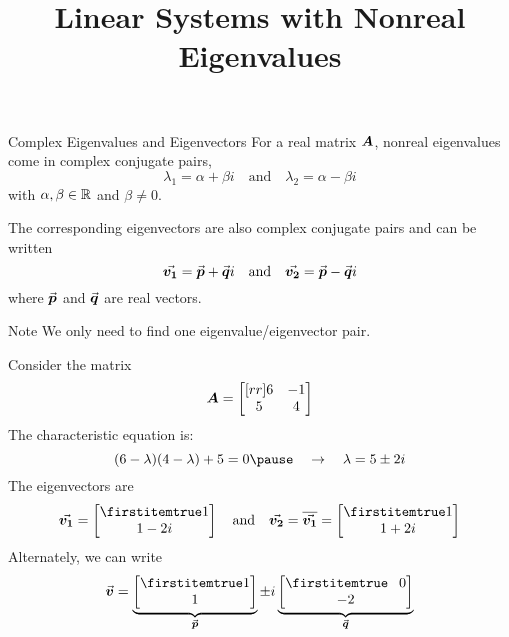 \documentclass{beamer}
\title[MA245 - Section 6.3]{Linear Systems with Nonreal Eigenvalues}
\begin{document}
\begin{frame}
  \titlepage
\end{frame}

\begin{frame}
\begin{block}{Complex Eigenvalues and Eigenvectors}
For a real matrix $\boldsymbol{A}$, nonreal eigenvalues come in complex conjugate pairs,
\begin{equation*}
\lambda_1=\alpha+\beta i
\quad\text{and}\quad
\lambda_2=\alpha-\beta i
\end{equation*}
with $\alpha,\beta\in\mathbb{R}$ and $\beta\neq0$.

\vspace{2mm}
The corresponding eigenvectors are also complex conjugate pairs and can be written
\begin{equation*}
{\vec{\boldsymbol{v_1}}}={\vec{\boldsymbol{p}}}+{\vec{\boldsymbol{q}}}i
\quad\text{and}\quad
{\vec{\boldsymbol{v_2}}}={\vec{\boldsymbol{p}}}-{\vec{\boldsymbol{q}}}i
\end{equation*}
where ${\vec{\boldsymbol{p}}}$ and ${\vec{\boldsymbol{q}}}$ are real vectors.
\end{block}\pause
\begin{block}{Note}
We only need to find one eigenvalue/eigenvector pair.
\end{block}
\end{frame}

\begin{frame}
\begin{example}
Consider the matrix
\begin{equation*}
\boldsymbol{A}=
\begin{bmatrix}[rr]
6 & -1 \\
5 &  4 \\
\end{bmatrix}
\end{equation*}\pause
The characteristic equation is:
\begin{equation*}
(6-\lambda)(4-\lambda)+5=0\pause
\quad\rightarrow\quad
\lambda=5\pm 2i
\end{equation*}\pause
The eigenvectors are
\begin{equation*}
\vect{v_1}=\bvector{1,1-2i}
\quad\text{and}\quad
\vect{v_2}=\overline{\vect{v_1}}=\bvector{1,1+2i}
\end{equation*}\pause
Alternately, we can write
\begin{equation*}
\vect{v}=\underbrace{\bvector{1,1}}_{\vect{p}}\pm i\underbrace{\bvector{\+0,-2}}_{\vect{q}}
\end{equation*}
\end{example}
\end{frame}
\end{document}

